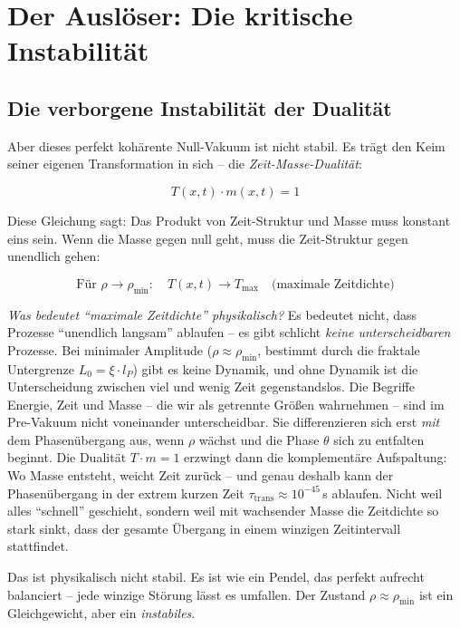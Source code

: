 	\section{Der Auslöser: Die kritische Instabilität}
	
	\subsection{Die verborgene Instabilität der Dualität}
	
	Aber dieses perfekt kohärente Null-Vakuum ist nicht stabil. Es trägt den Keim seiner eigenen Transformation in sich -- die \textit{Zeit-Masse-Dualität}:
	
	\begin{equation}
		T(x,t) \cdot m(x,t) = 1
	\end{equation}
	
	Diese Gleichung sagt: Das Produkt von Zeit-Struktur und Masse muss konstant eins sein. Wenn die Masse gegen null geht, muss die Zeit-Struktur gegen unendlich gehen:
	
	\begin{equation}
		\text{Für } \rho \to \rho_{\min}: \quad T(x,t) \to T_{\max} \quad \text{(maximale Zeitdichte)}
	\end{equation}
	
	\textit{Was bedeutet \enquote{maximale Zeitdichte} physikalisch?} Es bedeutet nicht, dass Prozesse \enquote{unendlich langsam} ablaufen -- es gibt schlicht \textit{keine unterscheidbaren} Prozesse. Bei minimaler Amplitude ($\rho \approx \rho_{\min}$, bestimmt durch die fraktale Untergrenze $L_0 = \xi \cdot l_P$) gibt es keine Dynamik, und ohne Dynamik ist die Unterscheidung zwischen viel und wenig Zeit gegenstandslos. Die Begriffe Energie, Zeit und Masse -- die wir als getrennte Größen wahrnehmen -- sind im Pre-Vakuum nicht voneinander unterscheidbar. Sie differenzieren sich erst \textit{mit} dem Phasenübergang aus, wenn $\rho$ wächst und die Phase $\theta$ sich zu entfalten beginnt. Die Dualität $T \cdot m = 1$ erzwingt dann die komplementäre Aufspaltung: Wo Masse entsteht, weicht Zeit zurück -- und genau deshalb kann der Phasenübergang in der extrem kurzen Zeit $\tau_{\text{trans}} \approx 10^{-45}\,$s ablaufen. Nicht weil alles \enquote{schnell} geschieht, sondern weil mit wachsender Masse die Zeitdichte so stark sinkt, dass der gesamte Übergang in einem winzigen Zeitintervall stattfindet.
	
	Das ist physikalisch nicht stabil. Es ist wie ein Pendel, das perfekt aufrecht balanciert -- jede winzige Störung lässt es umfallen. Der Zustand $\rho \approx \rho_{\min}$ ist ein Gleichgewicht, aber ein \textit{instabiles}.
	

